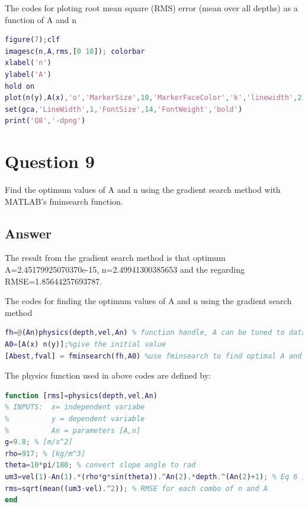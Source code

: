 \documentclass[
	12pt, %
]{fphw}
\begin{document}
The codes for ploting  root mean square (RMS) error (mean over all depths) as a function of A and n 

\begin{lstlisting}[language=Matlab,escapeinside=``]
figure(7);clf
imagesc(n,A,rms,[0 10]); colorbar
xlabel('n')
ylabel('A')
hold on
plot(n(y),A(x),'o','MarkerSize',10,'MarkerFaceColor','k','linewidth',2);
set(gca,'LineWidth',1,'FontSize',14,'FontWeight','bold')
print('Q8','-dpng')

\end{lstlisting}



\clearpage
\section*{Question 9 }

\begin{problem}
 Find the optimum values of A and n using the gradient search method with MATLAB's fminsearch function.
	
\end{problem}

\subsection*{Answer}

The result from the gradient search method is that optimum A=2.45179925070370e-15, n=2.49941300385653 and the regarding RMSE=1.85644257693787.

The codes for  finding the optimum values of A and n using the gradient search method
 
 \begin{lstlisting}[language=Matlab,escapeinside=``]
fh=@(An)physics(depth,vel,An) % function handle, A can be tuned to data in v,z
A0=[A(x) n(y)];%give the initial value
[Abest,fval] = fminsearch(fh,A0) %use fminsearch to find optimal A and n
\end{lstlisting}
 
The physics function used in above codes are defined by:

 \begin{lstlisting}[language=Matlab,escapeinside=``]
function [rms]=physics(depth,vel,An)
% INPUTS:  x= independent variabe
%          y = dependent variable
%          An = parameters [A,n]
g=9.8; % [m/s^2]
rho=917; % [kg/m^3]
theta=10*pi/180; % convert slope angle to rad
um3=vel(1)-An(1).*(rho*g*sin(theta)).^An(2).*depth.^(An(2)+1); % Eq 6 in HW3
rms=sqrt(mean((um3-vel).^2)); % RMSE for each combo of n and A
end
\end{lstlisting}
\end{document}
